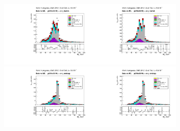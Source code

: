\begin{figure}[htb]
  \begin{center}
    \includegraphics[width=0.40\textwidth]{../figs/figs_v11/ELECTRON_WGamma/PrepareYields/c_TotalDATAvsMC_Barrel__Mpholep1PRELIMINARY_FOR_E_TO_GAMMA_WITH_PSV_CUT_pt25to30_.pdf}\includegraphics[width=0.40\textwidth]{../figs/figs_v11/ELECTRON_WGamma/PrepareYields/c_TotalDATAvsMC_Barrel__Mpholep1PRELIMINARY_FOR_E_TO_GAMMA_WITH_PSV_CUT_pt25to30__etogScale.pdf}   \\ 
    \includegraphics[width=0.40\textwidth]{../figs/figs_v11/ELECTRON_WGamma/PrepareYields/c_TotalDATAvsMC_Endcap__Mpholep1PRELIMINARY_FOR_E_TO_GAMMA_WITH_PSV_CUT_pt25to30_.pdf}\includegraphics[width=0.40\textwidth]{../figs/figs_v11/ELECTRON_WGamma/PrepareYields/c_TotalDATAvsMC_Endcap__Mpholep1PRELIMINARY_FOR_E_TO_GAMMA_WITH_PSV_CUT_pt25to30__etogScale.pdf}\\

\end{center}
\end{figure}
